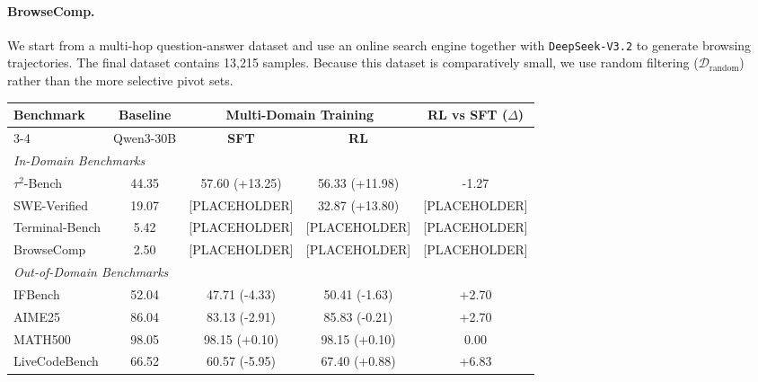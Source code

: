 \paragraph{BrowseComp.}
We start from a multi-hop question-answer dataset and use an online search engine together with \texttt{DeepSeek-V3.2} to generate browsing trajectories. The final dataset contains 13{,}215 samples. Because this dataset is comparatively small, we use random filtering ($\mathcal{D}_{\mathrm{random}}$) rather than the more selective pivot sets.

\begin{table}[t]
\centering
\small
\begin{tabular}{l c cc c}
\toprule
\multirow{2}{*}{\textbf{Benchmark}} 
& \multirow{2}{*}{\textbf{Baseline}} 
& \multicolumn{2}{c}{\textbf{Multi-Domain Training}}
& \multirow{2}{*}{\textbf{RL vs SFT ($\Delta$)}} \\
\cmidrule(lr){3-4}
& Qwen3-30B 
& \textbf{SFT} & \textbf{RL} & \\
\midrule
\midrule

\multicolumn{5}{l}{\textit{In-Domain Benchmarks}} \\
\midrule

$\tau^2$-Bench
& 44.35 
& 57.60 (+13.25) & 56.33 (+11.98) 
& -1.27 \\

SWE-Verified
& 19.07 
& [PLACEHOLDER] & 32.87 (+13.80) 
& [PLACEHOLDER] \\

Terminal-Bench
& 5.42 
& [PLACEHOLDER] & [PLACEHOLDER] 
& [PLACEHOLDER] \\

BrowseComp
& 2.50 
& [PLACEHOLDER] & [PLACEHOLDER] 
& [PLACEHOLDER] \\

\midrule
\multicolumn{5}{l}{\textit{Out-of-Domain Benchmarks}} \\
\midrule

IFBench 
& 52.04 
& 47.71 (-4.33)  & 50.41 (-1.63) 
& +2.70 \\

AIME25 
& 86.04 
& 83.13 (-2.91)  & 85.83 (-0.21) 
& +2.70 \\

MATH500 
& 98.05 
& 98.15 (+0.10)  & 98.15 (+0.10) 
& 0.00 \\

LiveCodeBench 
& 66.52 
& 60.57 (-5.95)  & 67.40 (+0.88) 
& +6.83 \\


\end{tabular}
\end{table}

